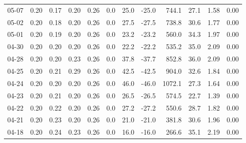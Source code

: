 \begin{threeparttable}
{\begin{tabular}{lrrrrrrrrrrr}
  05-07 &          0.20 &          0.17 &          0.20 &        0.26 &                 0.0 &                25.0 &      -25.0 &               744.1 &             27.1 &            1.58 &                   0.00 \\
  05-02 &          0.20 &          0.18 &          0.20 &        0.26 &                 0.0 &                27.5 &      -27.5 &               738.8 &             30.6 &            1.77 &                   0.00 \\
  05-01 &          0.20 &          0.19 &          0.20 &        0.26 &                 0.0 &                23.2 &      -23.2 &               560.0 &             34.3 &            1.97 &                   0.00 \\
  04-30 &          0.20 &          0.20 &          0.20 &        0.26 &                 0.0 &                22.2 &      -22.2 &               535.2 &             35.0 &            2.09 &                   0.00 \\
  04-28 &          0.20 &          0.20 &          0.23 &        0.26 &                 0.0 &                37.8 &      -37.7 &               852.8 &             36.0 &            2.09 &                   0.00 \\
  04-25 &          0.20 &          0.21 &          0.29 &        0.26 &                 0.0 &                42.5 &      -42.5 &               904.0 &             32.6 &            1.84 &                   0.00 \\
  04-24 &          0.20 &          0.20 &          0.20 &        0.26 &                 0.0 &                46.0 &      -46.0 &              1072.1 &             27.3 &            1.64 &                   0.00 \\
  04-23 &          0.20 &          0.21 &          0.20 &        0.26 &                 0.0 &                26.5 &      -26.5 &               574.5 &             22.7 &            1.39 &                   0.00 \\
  04-22 &          0.20 &          0.22 &          0.20 &        0.26 &                 0.0 &                27.2 &      -27.2 &               550.6 &             28.7 &            1.82 &                   0.00 \\
  04-21 &          0.20 &          0.23 &          0.20 &        0.26 &                 0.0 &                21.0 &      -21.0 &               381.8 &             30.6 &            1.96 &                   0.00 \\
  04-18 &          0.20 &          0.24 &          0.23 &        0.26 &                 0.0 &                16.0 &      -16.0 &               266.6 &             35.1 &            2.19 &                   0.00 \\

\end{tabular}}
\end{threeparttable}

